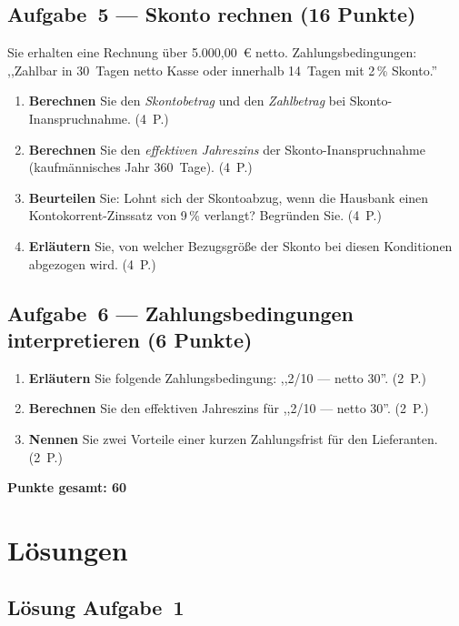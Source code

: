 \documentclass[11pt, a4paper]{article}
\begin{document}
\subsection*{Aufgabe~5 --- Skonto rechnen (16 Punkte)}

Sie erhalten eine Rechnung über 5.000,00~€ netto. Zahlungsbedingungen: ,,Zahlbar in
30~Tagen netto Kasse oder innerhalb 14~Tagen mit 2\,\% Skonto.''

\begin{enumerate}[label=(\alph*)]
  \item \textbf{Berechnen} Sie den \emph{Skontobetrag} und den \emph{Zahlbetrag} bei Skonto-Inanspruchnahme. \hfill (4~P.)
  \item \textbf{Berechnen} Sie den \emph{effektiven Jahreszins} der Skonto-Inanspruchnahme (kaufmännisches Jahr 360~Tage). \hfill (4~P.)
  \item \textbf{Beurteilen} Sie: Lohnt sich der Skontoabzug, wenn die Hausbank einen Kontokorrent-Zinssatz von 9\,\% verlangt? Begründen Sie. \hfill (4~P.)
  \item \textbf{Erläutern} Sie, von welcher Bezugsgröße der Skonto bei diesen Konditionen abgezogen wird. \hfill (4~P.)
\end{enumerate}

\subsection*{Aufgabe~6 --- Zahlungsbedingungen interpretieren (6 Punkte)}

\begin{enumerate}[label=(\alph*)]
  \item \textbf{Erläutern} Sie folgende Zahlungsbedingung: ,,2/10 --- netto 30''. \hfill (2~P.)
  \item \textbf{Berechnen} Sie den effektiven Jahreszins für ,,2/10 --- netto 30''. \hfill (2~P.)
  \item \textbf{Nennen} Sie zwei Vorteile einer kurzen Zahlungsfrist für den Lieferanten. \hfill (2~P.)
\end{enumerate}

\vspace{1em}
\noindent\textbf{Punkte gesamt: 60}

\newpage

\section{Lösungen}\label{loesungen}

\subsection*{Lösung Aufgabe~1}
\end{document}

